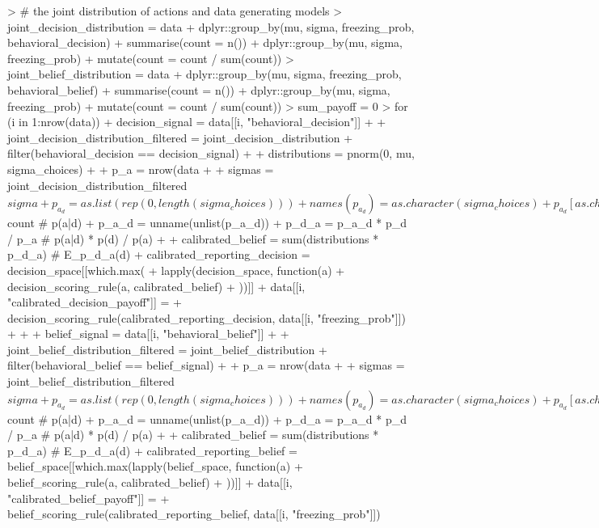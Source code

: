 \documentclass{article}
\begin{document}
\begin{Schunk}
\begin{Sinput}
> # the joint distribution of actions and data generating models
> joint_decision_distribution = data %>%
+   dplyr::group_by(mu, sigma, freezing_prob, behavioral_decision) %>%
+   summarise(count = n()) %>%
+   dplyr::group_by(mu, sigma, freezing_prob) %>%
+   mutate(count = count / sum(count))
> joint_belief_distribution = data %>%
+   dplyr::group_by(mu, sigma, freezing_prob, behavioral_belief) %>%
+   summarise(count = n()) %>%
+   dplyr::group_by(mu, sigma, freezing_prob) %>%
+   mutate(count = count / sum(count))
> sum_payoff = 0
> for (i in 1:nrow(data)) {
+   decision_signal = data[[i, "behavioral_decision"]]
+   
+   joint_decision_distribution_filtered = joint_decision_distribution %>%
+     filter(behavioral_decision == decision_signal)
+   
+   distributions = pnorm(0, mu, sigma_choices)
+   
+   p_a = nrow(data %>% filter(behavioral_decision == decision_signal)) / nrow(data)
+   
+   sigmas = joint_decision_distribution_filtered$sigma
+   p_a_d = as.list(rep(0, length(sigma_choices)))
+   names(p_a_d) = as.character(sigma_choices)
+   p_a_d[as.character(sigmas)] = joint_decision_distribution_filtered$count  # p(a|d)
+   p_a_d = unname(unlist(p_a_d))
+   p_d_a = p_a_d * p_d / p_a  # p(a|d) * p(d) / p(a)
+   
+   calibrated_belief = sum(distributions * p_d_a)  # E_p_d_a(d)
+   calibrated_reporting_decision = decision_space[[which.max(
+     lapply(decision_space, function(a) {
+       decision_scoring_rule(a, calibrated_belief)
+     }))]]
+   data[[i, "calibrated_decision_payoff"]] = 
+     decision_scoring_rule(calibrated_reporting_decision, data[[i, "freezing_prob"]])
+   
+   
+   belief_signal = data[[i, "behavioral_belief"]]
+   
+   joint_belief_distribution_filtered = joint_belief_distribution %>%
+     filter(behavioral_belief == belief_signal)
+   
+   p_a = nrow(data %>% filter(behavioral_belief == belief_signal)) / nrow(data)
+   
+   sigmas = joint_belief_distribution_filtered$sigma
+   p_a_d = as.list(rep(0, length(sigma_choices)))
+   names(p_a_d) = as.character(sigma_choices)
+   p_a_d[as.character(sigmas)] = joint_belief_distribution_filtered$count  # p(a|d)
+   p_a_d = unname(unlist(p_a_d))
+   p_d_a = p_a_d * p_d / p_a  # p(a|d) * p(d) / p(a)
+   
+   calibrated_belief = sum(distributions * p_d_a)  # E_p_d_a(d)
+   calibrated_reporting_belief = belief_space[[which.max(lapply(belief_space, function(a) {
+     belief_scoring_rule(a, calibrated_belief)
+   }))]]
+   data[[i, "calibrated_belief_payoff"]] = 
+     belief_scoring_rule(calibrated_reporting_belief, data[[i, "freezing_prob"]])
}
\end{Sinput}
\end{Schunk}
\end{document}
